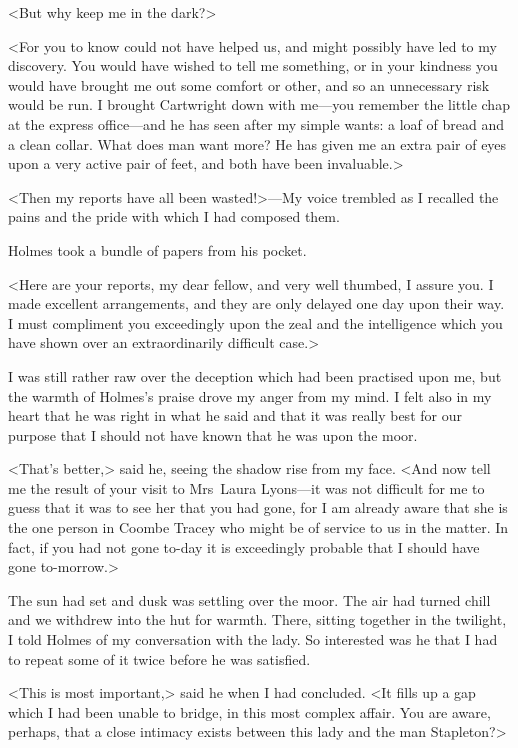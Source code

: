 <But why keep me in the dark?>

<For you to know could not have helped us, and might possibly have led to my discovery. You would have wished to tell me something, or in your kindness you would have brought me out some comfort or other, and so an unnecessary risk would be run. I brought Cartwright down with me—you remember the little chap at the express office—and he has seen after my simple wants: a loaf of bread and a clean collar. What does man want more? He has given me an extra pair of eyes upon a very active pair of feet, and both have been invaluable.>

<Then my reports have all been wasted!>—My voice trembled as I recalled the pains and the pride with which I had composed them.

Holmes took a bundle of papers from his pocket.

<Here are your reports, my dear fellow, and very well thumbed, I assure you. I made excellent arrangements, and they are only delayed one day upon their way. I must compliment you exceedingly upon the zeal and the intelligence which you have shown over an extraordinarily difficult case.>

I was still rather raw over the deception which had been practised upon me, but the warmth of Holmes's praise drove my anger from my mind. I felt also in my heart that he was right in what he said and that it was really best for our purpose that I should not have known that he was upon the moor.

<That's better,> said he, seeing the shadow rise from my face. <And now tell me the result of your visit to Mrs~Laura Lyons—it was not difficult for me to guess that it was to see her that you had gone, for I am already aware that she is the one person in Coombe Tracey who might be of service to us in the matter. In fact, if you had not gone to-day it is exceedingly probable that I should have gone to-morrow.>

The sun had set and dusk was settling over the moor. The air had turned chill and we withdrew into the hut for warmth. There, sitting together in the twilight, I told Holmes of my conversation with the lady. So interested was he that I had to repeat some of it twice before he was satisfied.

<This is most important,> said he when I had concluded. <It fills up a gap which I had been unable to bridge, in this most complex affair. You are aware, perhaps, that a close intimacy exists between this lady and the man Stapleton?>

